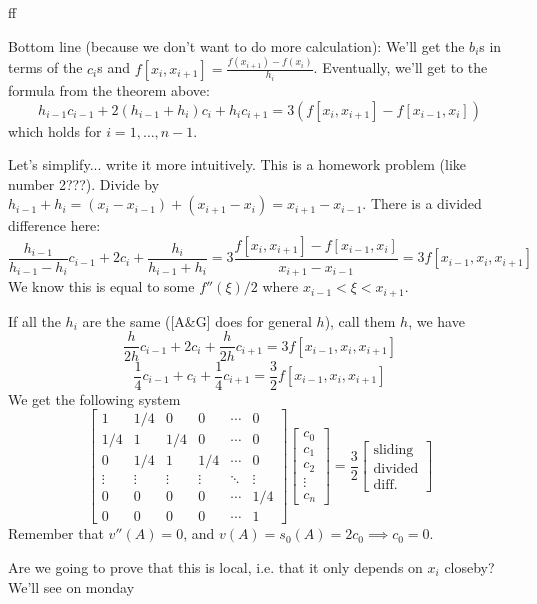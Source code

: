 \documentclass{article}
\theoremstyle{plain}
\theoremstyle{remark}
\begin{document}
ff

Bottom line (because we don't want to do more calculation):
We'll get the $b_i$s in terms of the $c_i$s and $f[x_i,x_{i+1}] = \frac{f(x_{i+1}) - f(x_i)}{h_i}$.
Eventually, we'll get to the formula from the theorem above:
\[
	h_{i-1} c_{i-1} + 2(h_{i-1} + h_i)c_i + h_ic_{i+1} = 3
	(f[x_i,x_{i+1}] - f[x_{i-1},x_i])
\]
which holds for $i = 1,\dots,n-1$.

Let's simplify... write it more intuitively.
This is a homework problem (like number 2???).
Divide by $h_{i-1} + h_i = (x_i - x_{i-1}) + (x_{i+1} - x_i) = x_{i+1} - x_{i-1}$.
There is a divided difference here:
\[
	\frac{h_{i-1}}{h_{i-1} - h_i}c_{i-1} + 2c_i + \frac{h_i}{h_{i-1} + h_i}
	= 3\frac{f[x_i,x_{i+1}] - f[x_{i-1},x_i]}{x_{i+1} - x_{i-1}}
	= 3f[x_{i-1},x_i,x_{i+1}]
\]
We know this is equal to some $f''(\xi)/2$ where $x_{i-1} < \xi < x_{i+1}$.

If all the $h_i$ are the same ([A\&G] does for general $h$),
call them $h$, we have
\[
	\frac{h}{2h}c_{i-1} + 2c_i + \frac{h}{2h}c_{i+1}
	= 3f[x_{i-1},x_i,x_{i+1}]
\]
\[
	\frac{1}{4}c_{i-1} + c_i + \frac{1}{4} c_{i+1} = \frac32 f[x_{i-1},x_i,x_{i+1}]
\]
We get the following system
\[
	\begin{bmatrix}
		1 & 1/4 & 0 & 0 & \cdots & 0\\
		1/4 & 1 & 1/4 & 0 & \cdots & 0\\
		0 & 1/4 & 1 & 1/4 & \cdots & 0\\
		\vdots & \vdots & \vdots & \vdots & \ddots & \vdots\\
		0 & 0 & 0 & 0 & \cdots & 1/4\\
		0 & 0 & 0 & 0 & \cdots & 1
	\end{bmatrix}
	\begin{bmatrix} c_0 \\ c_1 \\ c_2 \\ \vdots \\ c_n \end{bmatrix}
	= \frac{3}{2}\begin{bmatrix} \text{sliding} \\ \text{divided} \\ \text{diff.}\end{bmatrix}
\]
Remember that $v''(A) = 0$, and $v(A) = s_0(A) = 2c_0 \implies c_0 = 0$.

Are we going to prove that this is local, i.e. that
it only depends on $x_i$ closeby? We'll see on monday
\end{document}
